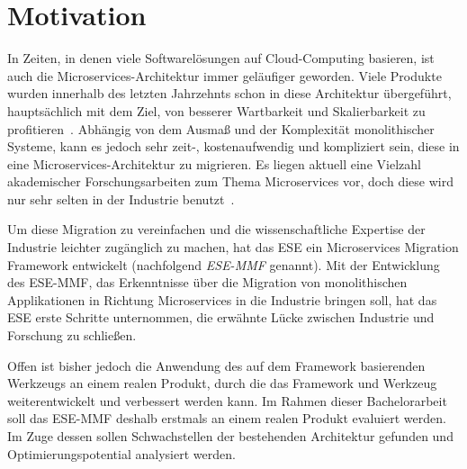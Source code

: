 \chapter{Motivation}
\label{chap:motivation}

In Zeiten, in denen viele Softwarelösungen auf Cloud-Computing basieren, ist auch die Microservices-Architektur immer geläufiger geworden.
Viele Produkte wurden innerhalb des letzten Jahrzehnts schon in diese Architektur übergeführt, hauptsächlich mit dem Ziel, von besserer Wartbarkeit und Skalierbarkeit zu profitieren~\cite{Fritzsch_2019}.
Abhängig von dem Ausmaß und der Komplexität monolithischer Systeme, kann es jedoch sehr zeit-, kostenaufwendig und kompliziert sein, diese in eine Microservices-Architektur zu migrieren.
Es liegen aktuell eine Vielzahl akademischer Forschungsarbeiten zum Thema Microservices vor, doch diese wird nur sehr selten in der Industrie benutzt~\cite{fritzsch2022architecturecentric}.

Um diese Migration zu vereinfachen und die wissenschaftliche Expertise der Industrie leichter zugänglich zu machen, hat das ESE ein Microservices Migration Framework entwickelt (nachfolgend \emph{ESE-MMF} genannt).
Mit der Entwicklung des ESE-MMF, das Erkenntnisse über die Migration von monolithischen Applikationen in Richtung Microservices in die Industrie bringen soll, hat das ESE erste Schritte unternommen, die erwähnte Lücke zwischen Industrie und Forschung zu schließen.

Offen ist bisher jedoch die Anwendung des auf dem Framework basierenden Werkzeugs an einem realen Produkt, durch die das Framework und Werkzeug weiterentwickelt und verbessert werden kann.
Im Rahmen dieser Bachelorarbeit soll das ESE-MMF deshalb erstmals an einem realen Produkt evaluiert werden.
Im Zuge dessen sollen Schwachstellen der bestehenden Architektur gefunden und Optimierungspotential analysiert werden.
